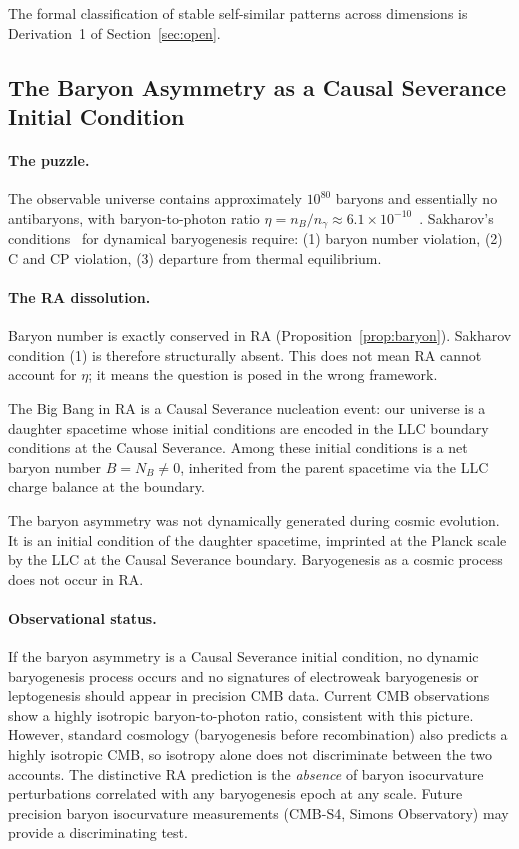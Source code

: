\documentclass[11pt,a4paper]{article}
\begin{document}
The formal classification of stable self-similar patterns across
dimensions is Derivation~1 of Section~\ref{sec:open}.

\subsection{The Baryon Asymmetry as a Causal Severance Initial Condition}
\label{sec:baryon_asym}

\paragraph{The puzzle.}
The observable universe contains approximately $10^{80}$ baryons and
essentially no antibaryons, with baryon-to-photon ratio
$\eta = n_B/n_\gamma \approx 6.1 \times 10^{-10}$~\citep{PDG2022}.
Sakharov's conditions~\citep{Sakharov1967} for dynamical baryogenesis
require: (1) baryon number violation, (2) C and CP violation, (3)
departure from thermal equilibrium.

\paragraph{The RA dissolution.}
Baryon number is exactly conserved in RA (Proposition~\ref{prop:baryon}).
Sakharov condition (1) is therefore structurally absent. This does not
mean RA cannot account for $\eta$; it means the question is posed in
the wrong framework.

The Big Bang in RA is a Causal Severance nucleation event: our universe
is a daughter spacetime whose initial conditions are encoded in the LLC
boundary conditions at the Causal Severance. Among these initial
conditions is a net baryon number $B = N_B \neq 0$, inherited from the
parent spacetime via the LLC charge balance at the boundary.

The baryon asymmetry was not dynamically generated during cosmic
evolution. It is an initial condition of the daughter spacetime,
imprinted at the Planck scale by the LLC at the Causal Severance
boundary. Baryogenesis as a cosmic process does not occur in RA.

\paragraph{Observational status.}
If the baryon asymmetry is a Causal Severance initial condition,
no dynamic baryogenesis process occurs and no signatures of
electroweak baryogenesis or leptogenesis should appear in precision
CMB data. Current CMB observations show a highly isotropic
baryon-to-photon ratio, consistent with this picture. However,
standard cosmology (baryogenesis before recombination) also predicts
a highly isotropic CMB, so isotropy alone does not discriminate
between the two accounts. The distinctive RA prediction is the
\emph{absence} of baryon isocurvature perturbations correlated
with any baryogenesis epoch at any scale. Future precision
baryon isocurvature measurements (CMB-S4, Simons Observatory)
may provide a discriminating test.
\end{document}
